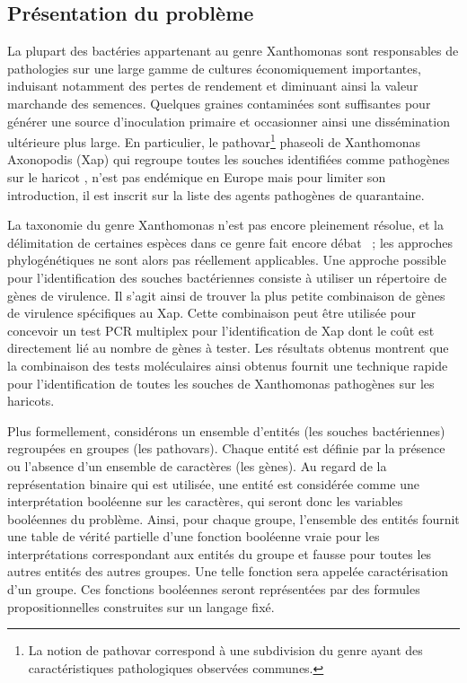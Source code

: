 \subsection{Présentation du problème}
La plupart des bactéries appartenant au genre Xanthomonas sont responsables de pathologies sur une large gamme de cultures économiquement importantes,  induisant notamment  des pertes de rendement et diminuant ainsi la valeur marchande des semences. Quelques graines contaminées sont suffisantes pour générer une source d'inoculation primaire et occasionner ainsi une dissémination ultérieure plus large. En particulier, le pathovar\footnote{La notion de pathovar correspond à une subdivision du genre ayant des caractéristiques pathologiques observées communes.} phaseoli de  Xanthomonas Axonopodis (Xap) qui regroupe toutes les souches identifiées comme pathogènes sur le haricot \cite{Vauterin1995}, n'est pas endémique en Europe mais pour limiter son introduction, il est inscrit sur la liste des agents pathogènes de quarantaine.

La taxonomie du genre Xanthomonas n'est pas encore pleinement résolue, et la délimitation de certaines espèces dans ce genre fait encore débat \cite{Schaad2005}~; les approches phylogénétiques ne sont alors pas réellement applicables. Une approche possible pour l'identification des souches bactériennes consiste à utiliser un répertoire de gènes de virulence. Il s'agit ainsi de trouver la plus petite combinaison de gènes de virulence spécifiques au Xap. Cette combinaison peut être utilisée pour concevoir un test PCR multiplex pour l'identification de Xap \cite{Boureau2013,Boureau2012} dont le coût est directement lié au nombre de gènes à tester. Les résultats obtenus
montrent que la combinaison des tests moléculaires ainsi obtenus fournit une technique rapide pour l'identification de toutes les souches de Xanthomonas pathogènes sur les haricots.

Plus formellement, considérons un ensemble d'entités (les souches bactériennes) regroupées en groupes (les pathovars). Chaque entité est définie par la présence ou l'absence d'un ensemble de caractères (les gènes). Au regard de la représentation binaire qui est utilisée, une entité est considérée comme une interprétation booléenne sur les caractères, qui seront donc les variables booléennes du problème. Ainsi, pour chaque groupe, l'ensemble des entités fournit une table de vérité partielle d'une fonction booléenne vraie pour les interprétations correspondant aux entités du groupe et fausse pour toutes les autres entités des autres groupes. Une telle fonction sera appelée caractérisation d'un groupe. Ces fonctions booléennes seront représentées par des formules propositionnelles construites sur un langage fixé.



